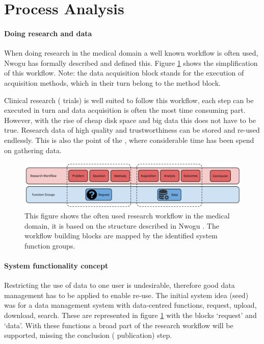 \section{Process Analysis}
\label{process-analysis}

\paragraph{Doing research and \project{} data}
When doing research in the medical domain a well known workflow is often used, Nwogu \cite{nwogu} has formally described and defined this.
Figure \ref{fig:research-workflow} shows the simplification of this workflow.
Note: the data acquisition block stands for the execution of acquisition methods, which in their turn belong to the method block.

Clinical research (\eg{} trials) is well suited to follow this workflow, each step can be executed in turn and data acquisition is often the most time consuming part.
However, with the rise of cheap disk space and big data this does not have to be true.
Research data of high quality and trustworthiness can be stored and re-used endlessly.
This is also the point of the \project{}, where considerable time has been spend on gathering data.

\begin{figure}[hb]
	\centering
	\includegraphics[width=1.0\linewidth]{images/research-workflow}
	\caption{
		This figure shows the often used research workflow in the medical domain, it is based on the structure described in Nwogu \cite{nwogu}.
		The workflow building blocks are mapped by the identified system function groups.
	}
	\label{fig:research-workflow}
\end{figure}

\paragraph{System functionality concept}
Restricting the use of data to one user is undesirable, therefore good data management has to be applied to enable re-use.
The initial system idea (seed) was for a data management system with data-centred functions, \eg{} request, upload, download, search.
These are represented in figure \ref{fig:research-workflow} with the blocks `request' and `data'.
With these functions a broad part of the research workflow will be supported, missing the conclusion (\ie{} publication) step.

